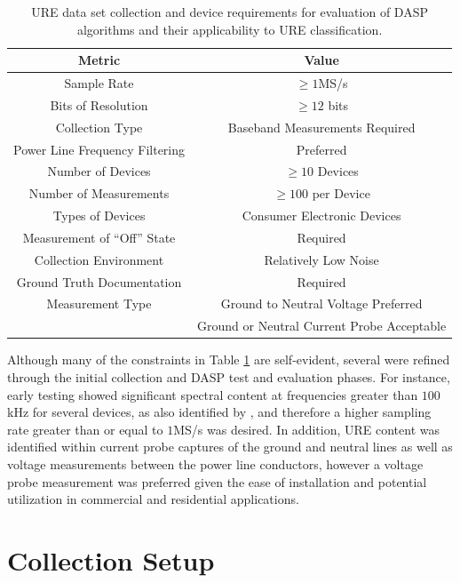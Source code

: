 \begin{table}[tb]
	\caption{URE data set collection and device requirements for evaluation of DASP algorithms and their applicability to URE classification.}
	\centering
		\begin{tabular}{c|c}
		\hline
		Metric & Value \\
		\hline
    Sample Rate & $ \ge 1$MS/s\\
		Bits of Resolution & $ \geq 12$ bits \\
		Collection Type & Baseband Measurements Required \\
		Power Line Frequency Filtering & Preferred \\
		Number of Devices & $\geq 10$ Devices \\
		Number of Measurements & $ \geq 100$ per Device\\
		Types of Devices & Consumer Electronic Devices \\
		Measurement of ``Off'' State & Required \\
		Collection Environment & Relatively Low Noise \\
		Ground Truth Documentation & Required \\
		Measurement Type & Ground to Neutral Voltage Preferred \\
		& Ground or Neutral Current Probe Acceptable \\
    \hline
		\end{tabular}
	\label{tab:collection_requirements}
\end{table}

Although many of the constraints in Table \ref{tab:collection_requirements} are self-evident, several were refined through the initial collection and DASP test and evaluation phases.  For instance, early testing showed significant spectral content at frequencies greater than $100$kHz for several devices, as also identified by \cite{Gulati2014}, and therefore a higher sampling rate greater than or equal to $1$MS/s was desired.   In addition, URE content was identified within current probe captures of the ground and neutral lines as well as voltage measurements between the power line conductors, however a voltage probe measurement was preferred given the ease of installation and potential utilization in commercial and residential applications.

\section[Collection Setup]{Collection Setup}

